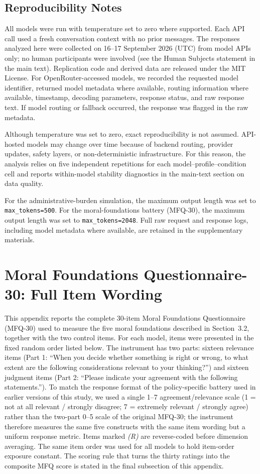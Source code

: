 \documentclass[11pt]{article}
\begin{document}
\subsection*{Reproducibility Notes}

All models were run with temperature set to zero where supported. Each API call used a fresh conversation context with no prior messages. The responses analyzed here were collected on 16--17 September 2026 (UTC) from model APIs only; no human participants were involved (see the Human Subjects statement in the main text). Replication code and derived data are released under the MIT License. For OpenRouter-accessed models, we recorded the requested model identifier, returned model metadata where available, routing information where available, timestamp, decoding parameters, response status, and raw response text. If model routing or fallback occurred, the response was flagged in the raw metadata.

Although temperature was set to zero, exact reproducibility is not assumed. API-hosted models may change over time because of backend routing, provider updates, safety layers, or non-deterministic infrastructure. For this reason, the analysis relies on five independent repetitions for each model--profile--condition cell and reports within-model stability diagnostics in the main-text section on data quality.

For the administrative-burden simulation, the maximum output length was set to \texttt{max\_tokens=500}. For the moral-foundations battery (MFQ-30), the maximum output length was set to \texttt{max\_tokens=2048}. Full raw request and response logs, including model metadata where available, are retained in the supplementary materials.
\clearpage   %
\section{Moral Foundations Questionnaire-30: Full Item Wording} \label{app:orientation-items} This appendix reports the complete 30-item Moral Foundations Questionnaire (MFQ-30) \citep{Graham2011} used to measure the five moral foundations described in Section~3.2, together with the two control items. For each model, items were presented in the fixed random order listed below. The instrument has two parts: sixteen relevance items (Part 1: ``When you decide whether something is right or wrong, to what extent are the following considerations relevant to your thinking?'') and sixteen judgment items (Part 2: ``Please indicate your agreement with the following statements.''). To match the response format of the policy-specific battery used in earlier versions of this study, we used a single 1--7 agreement/relevance scale (1 = not at all relevant / strongly disagree; 7 = extremely relevant / strongly agree) rather than the two-part 0--5 scale of the original MFQ-30; the instrument therefore measures the same five constructs with the same item wording but a uniform response metric. Items marked \textit{(R)} are reverse-coded before dimension averaging. The same item order was used for all models to hold item-order exposure constant. The scoring rule that turns the thirty ratings into the composite MFQ score is stated in the final subsection of this appendix.
\end{document}
